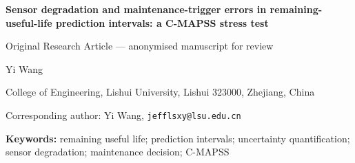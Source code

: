 
\onehalfspacing
\begin{center}
{\Large\bfseries Sensor degradation and maintenance-trigger errors in remaining-useful-life prediction intervals: a C-MAPSS stress test\par}
\vspace{0.6em}
\ifanon
{\small Original Research Article --- anonymised manuscript for review\par}
\else
{\normalsize Yi Wang\par}
{\small College of Engineering, Lishui University, Lishui 323000, Zhejiang, China\par}
{\small Corresponding author: Yi Wang, \texttt{jefflsxy@lsu.edu.cn}\par}
\fi
\end{center}
\vspace{0.4em}
\begin{abstract}\noindent

\end{abstract}
\noindent\textbf{Keywords:} remaining useful life; prediction intervals; uncertainty quantification; sensor degradation; maintenance decision; C-MAPSS
\bigskip











